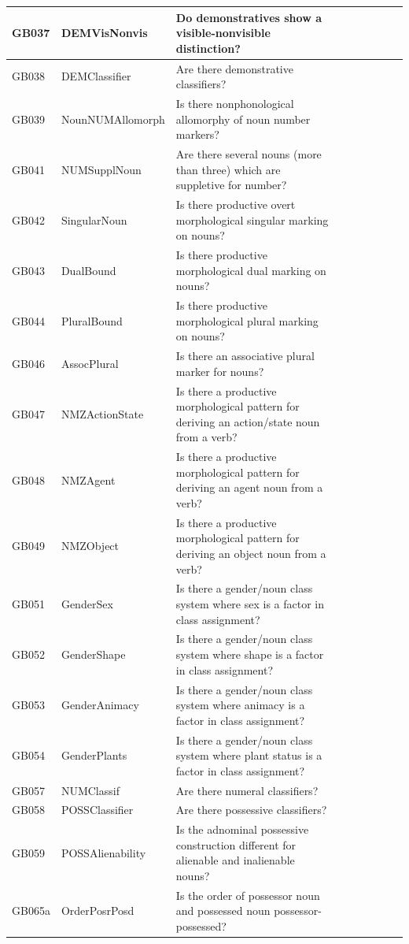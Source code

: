 \documentclass[draft,10pt]{article} %
\begin{document}
\begin{landscape}
\begin{longtable}{| l | p{4cm}| p{12cm}|p{2cm}|p{2cm}|p{2cm}|p{2cm}|p{2cm}|p{2cm}|}
GB037 & DEMVisNonvis&Do demonstratives show a visible-nonvisible distinction?\\ \hline
GB038 & DEMClassifier&Are there demonstrative classifiers?\\ \hline
GB039 & NounNUMAllomorph&Is there nonphonological allomorphy of noun number markers?\\ \hline
GB041 & NUMSupplNoun&Are there several nouns (more than three) which are suppletive for number?\\ \hline
GB042 & SingularNoun&Is there productive overt morphological singular marking on nouns?\\ \hline
GB043 & DualBound&Is there productive morphological dual marking on nouns?\\ \hline
GB044 & PluralBound&Is there productive morphological plural marking on nouns?\\ \hline
GB046 & AssocPlural&Is there an associative plural marker for nouns?\\ \hline
GB047 & NMZActionState&Is there a productive morphological pattern for deriving an action/state noun from a verb?\\ \hline
GB048 & NMZAgent&Is there a productive morphological pattern for deriving an agent noun from a verb?\\ \hline
GB049 & NMZObject&Is there a productive morphological pattern for deriving an object noun from a verb?\\ \hline
GB051 & GenderSex&Is there a gender/noun class system where sex is a factor in class assignment?\\ \hline
GB052 & GenderShape&Is there a gender/noun class system where shape is a factor in class assignment?\\ \hline
GB053 & GenderAnimacy&Is there a gender/noun class system where animacy is a factor in class assignment?\\ \hline
GB054 & GenderPlants&Is there a gender/noun class system where plant status is a factor in class assignment?\\ \hline
GB057 & NUMClassif&Are there numeral classifiers?\\ \hline
GB058 & POSSClassifier&Are there possessive classifiers?\\ \hline
GB059 & POSSAlienability&Is the adnominal possessive construction different for alienable and inalienable nouns?\\ \hline
GB065a & OrderPosrPosd&Is the order of possessor noun and possessed noun possessor-possessed?\\ \hline

\end{longtable}
\end{landscape}
\end{document}
